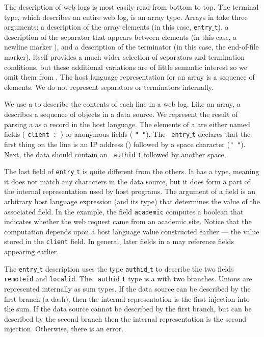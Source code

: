 The \ipads{} description of web logs is most easily read from bottom to top.
The terminal type, which describes an entire web log, is an array type.
Arrays in \ipads{} take three arguments: a description
of the array elements (in this case, {\tt entry$\_$t}),
a description of the separator that appears between elements
(in this case, a newline marker \Peor{}), and 
a description of the terminator (in this case, the end-of-file marker).
\pads{} itself provides a much wider selection of separators and
termination conditions, but these additional variations are of little semantic 
interest so we omit them from \ipads.  
The host language representation for 
an array is a sequence of elements. We do not represent separators or terminators internally.

We use a \Pstruct{} to describe the contents of each line in a web log.
Like an array, a \Pstruct{} describes a sequence of 
objects in a data source.  We represent the result of parsing a \Pstruct{} 
as a record in the host language.  The elements
of a \Pstruct{} are either named fields (\eg{} {\tt client : \Pip{}}) or
anonymous fields (\eg{} {\tt " "}).  The \Pstruct{} {\tt
entry$\_$t} declares that the first thing on the line
is an IP address (\Pip) followed by a space
character ({\tt " "}).  Next, the data should contain an {\tt
authid$\_$t} followed by another space, \etc{}

The last field of {\tt entry$\_$t} is quite different from the others.
It has a \Pcompute{} type, meaning it does not match any characters in
the data source, but it does form a part of the internal representation
used by host programs.  The argument of a \Pcompute{}
field is an arbitrary host language expression (and its
type) that determines the value of the associated field.  In the example, the
field {\tt academic} computes a boolean that indicates whether 
the web request came from an academic site. Notice that the computation
depends upon a host language value constructed earlier --- the value
stored in the {\tt client} field.  In general, later fields in a \Pstruct{} may
reference fields appearing earlier.

The {\tt entry$\_$t} description uses the type {\tt authid$\_$t} to
describe the two fields {\tt remoteid} and {\tt localid}.  The {\tt
authid$\_$t} type is a \Punion{} with two branches.  Unions are
represented internally as sum types.  If the data source can be
described by the first branch (a dash), then the internal
representation is the first injection into the sum.  If the data
source cannot be described by the first branch, but can be described
by the second branch then the internal representation is the second
injection.  Otherwise, there is an error.

